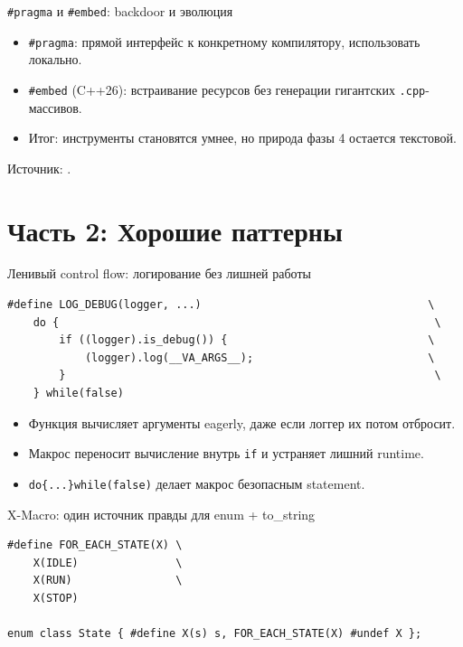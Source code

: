 \documentclass{beamer}
\begin{document}
\begin{frame}[fragile]{\texttt{\#pragma} и \texttt{\#embed}: backdoor и эволюция}
    \begin{itemize}
        \item \texttt{\#pragma}: прямой интерфейс к конкретному компилятору, использовать локально.
        \item \texttt{\#embed} (C++26): встраивание ресурсов без генерации гигантских \texttt{.cpp}-массивов.
        \item Итог: инструменты становятся умнее, но природа фазы 4 остается текстовой.
    \end{itemize}
    \vspace{0.3em}
    Источник: \cite{wg21_p1967r14}.
\end{frame}

\section{Часть 2: Хорошие паттерны}

\begin{frame}[fragile]{Ленивый control flow: логирование без лишней работы}
\begin{lstlisting}
#define LOG_DEBUG(logger, ...)                                   \
    do {                                                          \
        if ((logger).is_debug()) {                               \
            (logger).log(__VA_ARGS__);                           \
        }                                                         \
    } while(false)
\end{lstlisting}
    \begin{itemize}
        \item Функция вычисляет аргументы eagerly, даже если логгер их потом отбросит.
        \item Макрос переносит вычисление внутрь \texttt{if} и устраняет лишний runtime.
        \item \texttt{do\{...\}while(false)} делает макрос безопасным statement.
    \end{itemize}
\end{frame}

\begin{frame}[fragile]{X-Macro: один источник правды для enum + to\_string}
\begin{lstlisting}
#define FOR_EACH_STATE(X) \
    X(IDLE)               \
    X(RUN)                \
    X(STOP)

enum class State { #define X(s) s, FOR_EACH_STATE(X) #undef X };
\end{lstlisting}
\end{frame}
\end{document}
